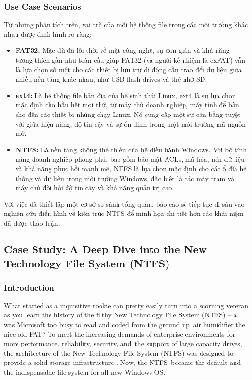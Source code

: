\documentclass[12pt]{article}
\begin{document}
\subsubsection{Use Case Scenarios}
Từ những phân tích trên, vai trò của mỗi hệ thống file trong các môi trường khác nhau được định hình rõ ràng:
\begin{itemize}
    \item \textbf{FAT32:} Mặc dù đã lỗi thời về mặt công nghệ, sự đơn giản và khả năng tương thích gần như toàn cầu giúp FAT32 (và người kế nhiệm là exFAT) vẫn là lựa chọn số một cho các thiết bị lưu trữ di động cần trao đổi dữ liệu giữa nhiều nền tảng khác nhau, như USB flash drives và thẻ nhớ SD.

    \item \textbf{ext4:} Là hệ thống file bản địa của hệ sinh thái Linux, ext4 là sự lựa chọn mặc định cho hầu hết mọi thứ, từ máy chủ doanh nghiệp, máy tính để bàn cho đến các thiết bị nhúng chạy Linux. Nó cung cấp một sự cân bằng tuyệt vời giữa hiệu năng, độ tin cậy và sự ổn định trong một môi trường mã nguồn mở.

    \item \textbf{NTFS:} Là nền tảng không thể thiếu của hệ điều hành Windows. Với bộ tính năng doanh nghiệp phong phú, bao gồm bảo mật ACLs, mã hóa, nén dữ liệu và khả năng phục hồi mạnh mẽ, NTFS là lựa chọn mặc định cho các ổ đĩa hệ thống và dữ liệu trong môi trường Windows, đặc biệt là các máy trạm và máy chủ đòi hỏi độ tin cậy và khả năng quản trị cao.
\end{itemize}

Với việc đã thiết lập một cơ sở so sánh tổng quan, báo cáo sẽ tiếp tục đi sâu vào nghiên cứu điển hình về kiến trúc NTFS để minh họa chi tiết hơn các khái niệm đã được thảo luận.



\subsection{Case Study: A Deep Dive into the New Technology File System (NTFS)}

\subsubsection{Introduction}
What started as a inquisitive rookie can pretty easily turn into a scorning veteran as you learn the history of the filthy New Technology File System (NTFS) – a was Microsoft too busy to read and coded from the ground up air humidifier the nice old FAT? To meet the increasing demands of enterprise environments for more performance, reliability, security, and the support of large capacity drives, the architecture of the New Technology File System (NTFS) was designed to provide a solid storage infrastructure \parencite{Shafiei2012}. Now, the NTFS became the default and the indispensable file system for all new Windows OS. 
\end{document}
